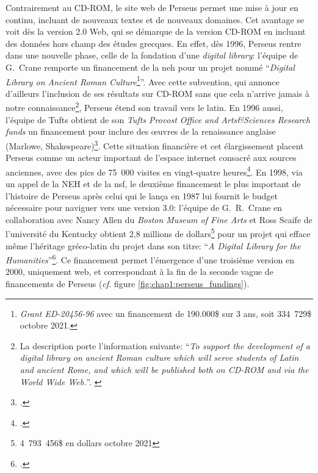 Contrairement au CD-ROM, le site web de Perseus permet une mise à jour en continu, incluant de nouveaux textes et de nouveaux domaines. Cet avantage se voit dès la version 2.0 Web, qui se démarque de la version CD-ROM en incluant des données hors champ des études grecques. En effet, dès 1996, Perseus rentre dans une nouvelle phase, celle de la fondation d'une \textit{digital library}: l'équipe de G.~Crane remporte un financement de la \acrshort{neh} pour un projet nommé \enquote{\textit{Digital Library on Ancient Roman Culture}\footnote{\textit{Grant ED-20456-96} avec un financement de 190.000\$ sur 3 ans, soit 334~729\$ octobre 2021.}}. Avec cette subvention, qui annonce d'ailleurs l'inclusion de ses résultats sur CD-ROM sans que cela n'arrive jamais à notre connaissance\footnote{La description porte l'information suivante: \enquote{\textit{To support the development of a digital library on ancient Roman culture which will serve students of Latin and ancient Rome, and which will be published both on CD-ROM and via the World Wide Web.}}. \cite{noauthor_neh_nodate}}, Perseus étend son travail vers le latin. En 1996 aussi, l'équipe de Tufts obtient de son \textit{Tufts Provost Office and Arts\&Sciences Research funds} un financement pour inclure des œuvres de la renaissance anglaise (Marlowe, Shakespeare)\footcite{crane_perseus_1998}. Cette situation financière et cet élargissement placent Perseus comme un acteur important de l'espace internet consacré aux sources anciennes, avec des pics de 75~000 visites en vingt-quatre heures\footcite{crane_digital_1998}. En 1998, via un appel de la NEH et de la \acrfull{nsf}, le deuxième financement le plus important de l'histoire de Perseus après celui qui le lança en 1987 lui fournit le budget nécessaire pour naviguer vers une version 3.0: l'équipe de G.~R.~Crane en collaboration avec Nancy Allen du \textit{Boston Museum of Fine Arts} et Ross Scaife de l'université du Kentucky obtient 2,8 millions de dollars\footnote{4~793~456\$ en dollars octobre 2021} pour un projet qui efface même l'héritage gréco-latin du projet dans son titre: \enquote{\textit{A Digital Library for the Humanities}}\footcite{crane_digital_1998}. Ce financement permet l'émergence d'une troisième version en 2000, uniquement web, et correspondant à la fin de la seconde vague de financements de Perseus (\textit{cf.} figure \ref{fig:chap1:perseus_fundings}).

